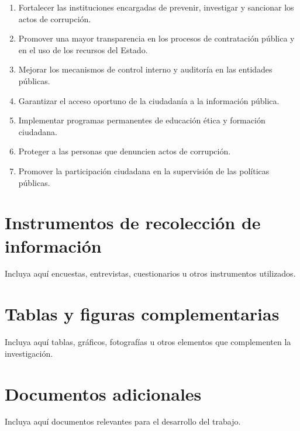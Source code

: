 \documentclass[12pt,a4paper]{article}
\begin{document}
\begin{enumerate}[label=\arabic*.]
    \item Fortalecer las instituciones encargadas de prevenir, investigar y sancionar los actos de corrupción.
    
    \item Promover una mayor transparencia en los procesos de contratación pública y en el uso de los recursos del Estado.
    
    \item Mejorar los mecanismos de control interno y auditoría en las entidades públicas.
    
    \item Garantizar el acceso oportuno de la ciudadanía a la información pública.
    
    \item Implementar programas permanentes de educación ética y formación ciudadana.
    
    \item Proteger a las personas que denuncien actos de corrupción.
    
    \item Promover la participación ciudadana en la supervisión de las políticas públicas.
\end{enumerate}

\newpage
\printbibliography[
    heading=bibintoc,
    title={Referencias}
]

%
%  
\newpage
\appendix

\section{Instrumentos de recolección de información}

Incluya aquí encuestas, entrevistas, cuestionarios u otros instrumentos utilizados.

\section{Tablas y figuras complementarias}

Incluya aquí tablas, gráficos, fotografías u otros elementos que complementen la investigación.

\section{Documentos adicionales}

Incluya aquí documentos relevantes para el desarrollo del trabajo.
\end{document}
